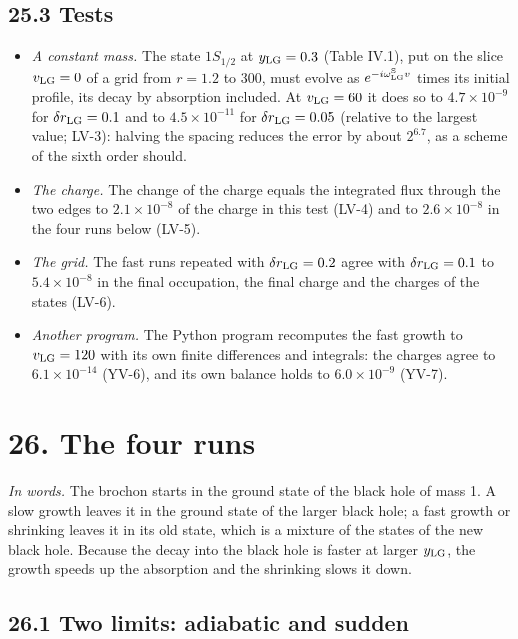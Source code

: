 \documentclass[
  10pt,
]{article}
\providecommand{\tightlist}{%
  \setlength{\itemsep}{0pt}\setlength{\parskip}{0pt}}
\begin{document}
\hypertarget{tests}{%
\subsection{25.3 Tests}\label{tests}}

\begin{itemize}
\tightlist
\item
  \emph{A constant mass.} The state \(1S_{1/2}\) at \(y_{\rm LG}=0.3\)
  (Table IV.1), put on the slice \(v_{\rm LG}=0\) of a grid from
  \(r=1.2\) to \(300\), must evolve as
  \(e^{-i\omega^{\rm S}_{\rm LG}v}\) times its initial profile, its
  decay by absorption included. At \(v_{\rm LG}=60\) it does so to
  \(4.7\times10^{-9}\) for \(\delta r_{\rm LG}=0.1\) and to
  \(4.5\times10^{-11}\) for \(\delta r_{\rm LG}=0.05\) (relative to the
  largest value; LV-3): halving the spacing reduces the error by about
  \(2^{6.7}\), as a scheme of the sixth order should.
\item
  \emph{The charge.} The change of the charge equals the integrated flux
  through the two edges to \(2.1\times10^{-8}\) of the charge in this
  test (LV-4) and to \(2.6\times10^{-8}\) in the four runs below (LV-5).
\item
  \emph{The grid.} The fast runs repeated with \(\delta r_{\rm LG}=0.2\)
  agree with \(\delta r_{\rm LG}=0.1\) to \(5.4\times10^{-8}\) in the
  final occupation, the final charge and the charges of the states
  (LV-6).
\item
  \emph{Another program.} The Python program recomputes the fast growth
  to \(v_{\rm LG}=120\) with its own finite differences and integrals:
  the charges agree to \(6.1\times10^{-14}\) (YV-6), and its own balance
  holds to \(6.0\times10^{-9}\) (YV-7).
\end{itemize}

\hypertarget{the-four-runs}{%
\section{26. The four runs}\label{the-four-runs}}

\emph{In words.} The brochon starts in the ground state of the black
hole of mass 1. A slow growth leaves it in the ground state of the
larger black hole; a fast growth or shrinking leaves it in its old
state, which is a mixture of the states of the new black hole. Because
the decay into the black hole is faster at larger \(y_{\rm LG}\), the
growth speeds up the absorption and the shrinking slows it down.

\hypertarget{two-limits-adiabatic-and-sudden}{%
\subsection{26.1 Two limits: adiabatic and
sudden}\label{two-limits-adiabatic-and-sudden}}
\end{document}

